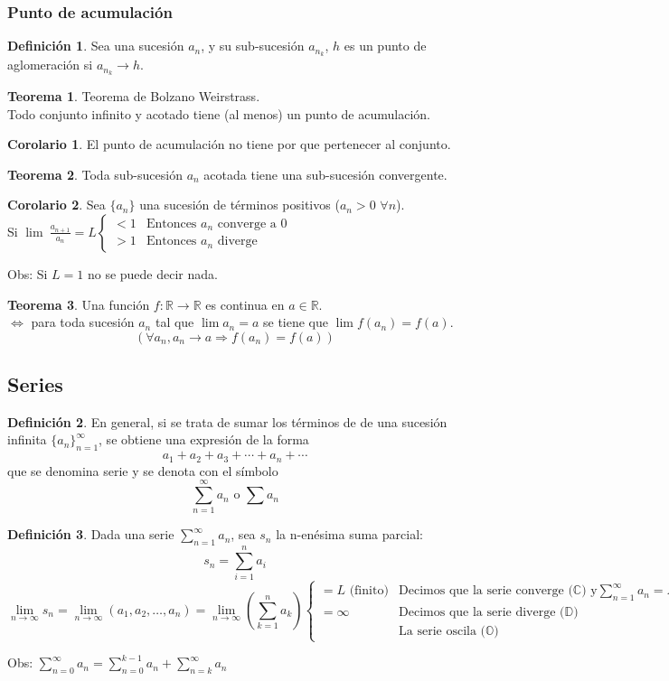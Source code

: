 \documentclass[10pt]{article}
\theoremstyle{definition}
\newtheorem{definition}{Definición}[section]
\newtheorem{theorem}{Teorema}[section]
\newtheorem{corollary}{Corolario}[theorem]
\begin{document}
\subsubsection{Punto de acumulación}
\begin{definition}
	Sea una sucesión $a_n$, y su sub-sucesión $a_{n_k}$, $h$ es un punto de aglomeración si $a_{n_k}\to h$.
\end{definition}
\begin{theorem}{Teorema de Bolzano Weirstrass.}
	\\Todo conjunto infinito y acotado tiene (al menos) un punto de acumulación.
\end{theorem}
\begin{corollary}
	El punto de acumulación no tiene por que pertenecer al conjunto.
\end{corollary}
\begin{theorem}
	Toda sub-sucesión $a_n$ acotada tiene una sub-sucesión convergente.
\end{theorem}
\begin{corollary}
	Sea $\{a_n\}$ una sucesión de términos positivos ($a_n>0$ $\forall n$).\\
	Si $\lim \ \frac{a_{n+1}}{a_{n}} =L\begin{cases}< 1 & \text{Entonces $a_n$ converge a $0$}\\ >1 & \text{Entonces $a_n$ diverge}\end{cases}$
\end{corollary}
Obs: Si $L=1$ no se puede decir nada.
\begin{theorem}
	Una función $f: \mathbb{R}\rightarrow\mathbb{R}$ es continua en $a\in\mathbb{R}$.\\
	$\Leftrightarrow$ para toda sucesión ${a_n}$ tal que $\lim a_n=a$ se tiene que $\lim f(a_n)=f(a)$.
	$$(\forall {a_n}, a_n\rightarrow a \Rightarrow f(a_n)=f(a))$$
\end{theorem}
\newpage
\subsection{Series}
\begin{definition}
	En general, si se trata de sumar los términos de de una sucesión infinita $\{a_n\}_{n=1}^{\infty}$, se obtiene una expresión de la forma $$a_1+a_2+a_3+\cdots+a_n+\cdots$$
	que se denomina serie y se denota con el símbolo $$\sum_{n=1}^{\infty} a_n \text{ o } \sum a_n$$
\end{definition}
\begin{definition}
	Dada una serie $\sum_{n=1}^{\infty} a_n$, sea $s_n$ la n-enésima suma parcial: $$s_n=\sum_{i=1}^{n} a_i$$
	$$\lim _{n \to \infty} s_{n} =\lim _{n \to \infty} (a_{1} ,a_{2} ,\dotsc ,a_{n} )=\lim _{n \to \infty} \left(\sum _{k=1}^{n} a_{k} \right)\begin{cases}=L \text{ (finito)} & \text{Decimos que la serie converge (}\mathbb{C}\text{) y}\sum _{n=1}^{\infty } a_{n} =L  \\=\infty  & \text{Decimos que la serie diverge (}\mathbb{D}\text{)}\\ & \text{La serie oscila (}\mathbb{O}\text{)}\end{cases}$$
\end{definition}
Obs: $\sum_{n=0}^{\infty} a_n = \sum_{n=0}^{k-1} a_n + \sum_{n=k}^{\infty} a_n$
\end{document}
